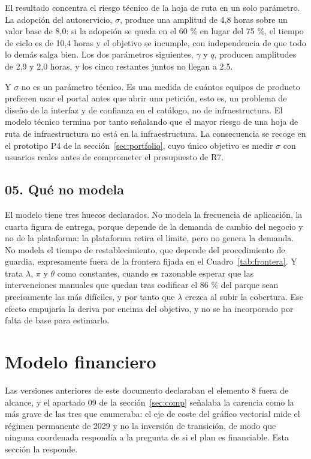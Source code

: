 \documentclass[11pt,letterpaper]{article}
\newcommand{\subsec}[1]{%
  \subsection*{#1}%
  \phantomsection\addcontentsline{toc}{subsection}{#1}}
\begin{document}
El resultado concentra el riesgo técnico de la hoja de ruta en un solo
parámetro. La adopción del autoservicio, $\sigma$, produce una amplitud de
4,8 horas sobre un valor base de 8,0: si la adopción se queda en el 60 \% en
lugar del 75 \%, el tiempo de ciclo es de 10,4 horas y el objetivo se
incumple, con independencia de que todo lo demás salga bien. Los dos
parámetros siguientes, $\gamma$ y $q$, producen amplitudes de 2,9 y 2,0
horas, y los cinco restantes juntos no llegan a 2,5.

Y $\sigma$ no es un parámetro técnico. Es una medida de cuántos equipos de
producto prefieren usar el portal antes que abrir una petición, esto es, un
problema de diseño de la interfaz y de confianza en el catálogo, no de
infraestructura. El modelo técnico termina por tanto señalando que el mayor
riesgo de una hoja de ruta de infraestructura no está en la infraestructura.
La consecuencia se recoge en el prototipo P4 de la
sección~\ref{sec:portfolio}, cuyo único objetivo es medir $\sigma$ con
usuarios reales antes de comprometer el presupuesto de R7.

\subsec{05. Qué no modela}

El modelo tiene tres huecos declarados. No modela la frecuencia de aplicación,
la cuarta figura de entrega, porque depende de la demanda de cambio del
negocio y no de la plataforma: la plataforma retira el límite, pero no genera
la demanda. No modela el tiempo de restablecimiento, que depende del
procedimiento de guardia, expresamente fuera de la frontera fijada en el
Cuadro~\ref{tab:frontera}. Y trata $\lambda$, $\pi$ y $\theta$ como
constantes, cuando es razonable esperar que las intervenciones manuales que
quedan tras codificar el 86 \% del parque sean precisamente las más difíciles,
y por tanto que $\lambda$ crezca al subir la cobertura. Ese efecto empujaría
la deriva por encima del objetivo, y no se ha incorporado por falta de base
para estimarlo.

\section{Modelo financiero}
\label{sec:financiero}

Las versiones anteriores de este documento declaraban el elemento 8 fuera de
alcance, y el apartado 09 de la sección~\ref{sec:comp} señalaba la carencia
como la más grave de las tres que enumeraba: el eje de coste del gráfico
vectorial mide el régimen permanente de 2029 y no la inversión de transición,
de modo que ninguna coordenada respondía a la pregunta de si el plan es
financiable. Esta sección la responde.
\end{document}
